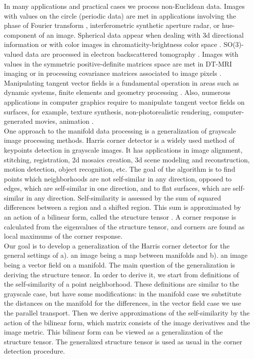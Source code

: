 \documentclass[a4paper,twoside]{article}
\begin{document}
\noindent In many applications and practical cases we process non-Euclidean data. Images with values on the circle (periodic data) are met in applications involving the phase of Fourier transform \cite{CircleData1, CircleData2}, interferometric synthetic aperture radar\cite{CircleData3}, or hue-component of an image. Spherical data appear when dealing with 3d directional information \cite{SphereData1, SphereData2} or with color images in chromaticity-brightness color space \cite{SphereData3}. SO(3)-valued data are processed in electron backscattered tomography \cite{SO3Data1, SO3Data2}. Images with values in the symmetric positive-definite matrices space are met in DT-MRI imaging \cite{SPDMatrixData1, SPDMatrixData2} or in processing covariance matrices associated to image pixels \cite{SPDMatrixData3}. 
\\
Manipulating tangent vector fields is a fundamental operation in areas such as dynamic systems, finite elements and geometry processing \cite{TangentProc}. Also, numerous applications in computer graphics require to manipulate tangent vector fields on surfaces, for example, texture synthesis, non-photorealistic rendering, computer-generated movies, animation \cite{VectorProc}.
\\
One approach to the manifold data processing is a generalization of grayscale image processing methods. Harris corner detector is a widely used method of keypoints detection in grayscale images. It has applications in image alignment, stitching, registration, 2d mosaics creation, 3d scene modeling and reconstruction, motion detection, object recognition, etc. The goal of the algorithm is to find points which neighborhoods are not self-similar in any direction, opposed to edges, which are self-similar in one direction, and to flat surfaces, which are self-similar in any direction. Self-similarity is assessed by the sum of squared differences between a region and a shifted region. This sum is approximated by an action of a bilinear form, called the structure tensor \cite{StructureTensor}. A corner response is calculated from the eigenvalues of the structure tensor, and corners are found as local maximums of the corner response.
\\
Our goal is to develop a generalization of the Harris corner detector for the general settings of a). an image being a map between manifolds and b). an image being a vector field on a manifold. The main question of the generalization is deriving the structure tensor. In order to derive it, we start from definitions of the self-similarity of a point neighborhood. These definitions are similar to the grayscale case, but have some modifications: in the manifold case we substitute the distances on the manifold for the differences, in the vector field case we use the parallel transport. Then we derive approximations of the self-similarity by the action of the bilinear form, which matrix consists of the image derivatives and the image metric. This bilinear form can be viewed as a generalization of the structure tensor. The generalized structure tensor is used as usual in the corner detection procedure.
\end{document}
